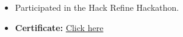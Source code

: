 \documentclass[a4paper,10pt]{article}
\begin{document}
\begin{multicols}{2}
    \begin{itemize}
        \item Participated in the Hack Refine Hackathon.
    \end{itemize}
    
    \columnbreak
    
    \begin{itemize}
        \item \textbf{Certificate:} \href{https://acrobat.adobe.com/link/review?uri=urn:aaid:scds:US:2e58002b-6058-312f-8fc2-a18b5f35ada0}{Click here}
    \end{itemize}
\end{multicols}
\end{document}
